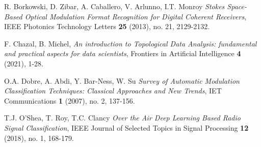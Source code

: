 \documentclass[12pt]{article}
\theoremstyle{plain}
\theoremstyle{definition}
\theoremstyle{remark}
\begin{document}
	\begin{thebibliography}{10}
		
		R. Borkowski, D. Zibar, A. Caballero, V. Arlunno, I.T. Monroy \emph{Stokes Space-Based Optical Modulation Format Recognition for Digital Coherent Receivers}, IEEE Photonics Technology Letters {\bf 25} (2013), no. 21, 2129-2132.
		
		F. Chazal, B. Michel, \emph{An introduction to Topological Data Analysis: fundamental and practical aspects for data scientists}, Frontiers in Artificial Intelligence \textbf{4} (2021), 1-28.
		
		O.A. Dobre, A. Abdi, Y. Bar-Ness, W. Su \emph{Survey of Automatic Modulation Classification Techniques: Classical Approaches and New Trends}, IET Communications {\bf 1} (2007), no. 2, 137-156.
		
		T.J. O'Shea, T. Roy, T.C. Clancy \emph{Over the Air Deep Learning Based Radio Signal Classification}, IEEE Journal of Selected Topics in Signal Processing {\bf 12} (2018), no. 1, 168-179.
		
	\end{thebibliography}
	
	
	
\end{document}

